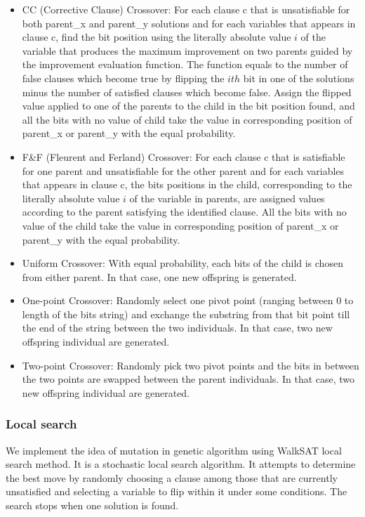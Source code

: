 \begin{itemize}
	\item
	      CC (Corrective Clause) Crossover: For each clause c that is unsatisfiable for
	      both parent\_x and parent\_y solutions and for each variables that appears in
	      clause c, find the bit position using the literally absolute value
	      $i$ of the variable that produces the maximum improvement on
	      two parents guided by the improvement evaluation function. The function equals
	      to the number of false clauses which become true by flipping the
	      $ith$ bit in one of the solutions minus the number of satisfied
	      clauses which become false. Assign the flipped value applied to one of the
	      parents to the child in the bit position found, and all the bits with no value
	      of child take the value in corresponding position of parent\_x or parent\_y
	      with the equal probability.
	\item
	      F\&F (Fleurent and Ferland) Crossover: For each clause c that is satisfiable
	      for one parent and unsatisfiable for the other parent and for each variables
	      that appears in clause c, the bits positions in the child, corresponding to
	      the literally absolute value $i$ of the variable in parents,
	      are assigned values according to the parent satisfying the identified clause.
	      All the bits with no value of the child take the value in corresponding
	      position of parent\_x or parent\_y with the equal probability.
	\item
	      Uniform Crossover: With equal probability, each bits of the child is chosen
	      from either parent. In that case, one new offspring is generated.
	\item
	      One-point Crossover: Randomly select one pivot point (ranging between 0 to
	      length of the bits string) and exchange the substring from that bit point till
	      the end of the string between the two individuals. In that case, two new
	      offspring individual are generated.
	\item
	      Two-point Crossover: Randomly pick two pivot points and the bits in between
	      the two points are swapped between the parent individuals. In that case, two
	      new offspring individual are generated.
\end{itemize}

\subsubsection{Local search}
We implement the idea of mutation in genetic algorithm using WalkSAT local
search method. It is a stochastic local search algorithm. It attempts to
determine the best move by randomly choosing a clause among those that are
currently unsatisfied and selecting a variable to flip within it under some
conditions. The search stops when one solution is found.

